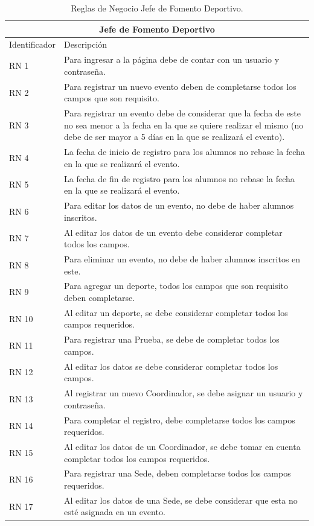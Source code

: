 	\begin{table}[hbt!]
		\begin{center}
			\begin{tabular}{|p{30mm}|p{100mm}|}
				\hline
				\multicolumn{2}{|c|}{Jefe de Fomento Deportivo} \\
				\hline
				Identificador & Descripción \\
				\hline 
				RN 1 & Para ingresar a la página debe de contar con un usuario y contraseña. \\ \hline
				RN 2 &  Para registrar un nuevo evento deben de completarse todos los campos que son requisito.\\ \hline
				RN 3 & Para registrar un evento debe de considerar que la fecha de este no sea menor a la fecha en la que se quiere realizar el mismo (no debe de ser mayor  a 5 días en la que se realizará el evento). \\ \hline
				RN 4 &  La fecha de inicio de registro para los alumnos no rebase la fecha en la que se realizará el evento.\\ \hline
				RN 5 &  La fecha de fin de registro para los alumnos no rebase la fecha en la que se realizará el evento. \\ \hline
				RN 6 & Para editar los datos de un evento, no debe de haber alumnos inscritos. \\ \hline
				RN 7 &  Al editar los datos de un evento debe considerar completar todos los campos.\\ \hline
				RN 8 &  Para eliminar un evento, no debe de haber alumnos inscritos en este.\\ \hline
				RN 9 &  Para agregar un deporte, todos los campos que son requisito deben completarse.\\ \hline
				RN 10 &  Al editar un deporte, se debe considerar completar todos los campos requeridos.\\ \hline
				RN 11 &  Para registrar una Prueba, se debe de completar todos los campos.\\ \hline
				RN 12 & Al editar los datos se debe considerar completar todos los campos.\\ \hline
				RN 13 &  Al registrar un nuevo Coordinador, se debe asignar un usuario y contraseña.\\ \hline
				RN 14 &  Para completar el registro, debe completarse todos los campos requeridos.\\ \hline
				RN 15 &  Al editar los datos de un Coordinador, se debe tomar en cuenta completar todos los campos requeridos.\\ \hline
				RN 16 &  Para registrar una Sede, deben completarse todos los campos requeridos.\\ \hline
				RN 17 &  Al editar los datos de una Sede, se debe considerar que esta no esté asignada en un evento.\\ \hline
			\end{tabular}
			\caption{Reglas de Negocio Jefe de Fomento Deportivo.}
			\label{RNJFD}
		\end{center}
	\end{table}
	
